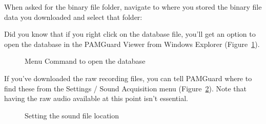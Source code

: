 \documentclass[
]{article}
\begin{document}
When asked for the binary file folder, navigate to where you stored the
binary file data you downloaded and select that folder:

Did you know that if you right click on the database file, you'll get an
option to open the database in the PAMGuard Viewer from Windows Explorer
(Figure~\ref{fig-dbmenu}).

\begin{figure}


\caption{\label{fig-dbmenu}Menu Command to open the database}

\end{figure}%

If you've downloaded the raw recording files, you can tell PAMGuard
where to find these from the Settings / Sound Acquisition menu
(Figure~\ref{fig-wavfiles}). Note that having the raw audio available at
this point isn't essential.

\begin{figure}


\caption{\label{fig-wavfiles}Setting the sound file location}

\end{figure}%
\end{document}
